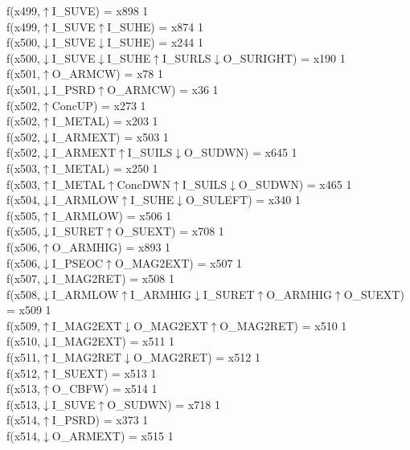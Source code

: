 f(x499,$\uparrow$I\_SUVE) = x898 {1} \\
f(x499,$\uparrow$I\_SUVE$\uparrow$I\_SUHE) = x874 {1} \\
f(x500,$\downarrow$I\_SUVE$\downarrow$I\_SUHE) = x244 {1} \\
f(x500,$\downarrow$I\_SUVE$\downarrow$I\_SUHE$\uparrow$I\_SURLS$\downarrow$O\_SURIGHT) = x190 {1} \\
f(x501,$\uparrow$O\_ARMCW) = x78 {1} \\
f(x501,$\downarrow$I\_PSRD$\uparrow$O\_ARMCW) = x36 {1} \\
f(x502,$\uparrow$ConcUP) = x273 {1} \\
f(x502,$\uparrow$I\_METAL) = x203 {1} \\
f(x502,$\downarrow$I\_ARMEXT) = x503 {1} \\
f(x502,$\downarrow$I\_ARMEXT$\uparrow$I\_SUILS$\downarrow$O\_SUDWN) = x645 {1} \\
f(x503,$\uparrow$I\_METAL) = x250 {1} \\
f(x503,$\uparrow$I\_METAL$\uparrow$ConcDWN$\uparrow$I\_SUILS$\downarrow$O\_SUDWN) = x465 {1} \\
f(x504,$\downarrow$I\_ARMLOW$\uparrow$I\_SUHE$\downarrow$O\_SULEFT) = x340 {1} \\
f(x505,$\uparrow$I\_ARMLOW) = x506 {1} \\
f(x505,$\downarrow$I\_SURET$\uparrow$O\_SUEXT) = x708 {1} \\
f(x506,$\uparrow$O\_ARMHIG) = x893 {1} \\
f(x506,$\downarrow$I\_PSEOC$\uparrow$O\_MAG2EXT) = x507 {1} \\
f(x507,$\downarrow$I\_MAG2RET) = x508 {1} \\
f(x508,$\downarrow$I\_ARMLOW$\uparrow$I\_ARMHIG$\downarrow$I\_SURET$\uparrow$O\_ARMHIG$\uparrow$O\_SUEXT) = x509 {1} \\
f(x509,$\uparrow$I\_MAG2EXT$\downarrow$O\_MAG2EXT$\uparrow$O\_MAG2RET) = x510 {1} \\
f(x510,$\downarrow$I\_MAG2EXT) = x511 {1} \\
f(x511,$\uparrow$I\_MAG2RET$\downarrow$O\_MAG2RET) = x512 {1} \\
f(x512,$\uparrow$I\_SUEXT) = x513 {1} \\
f(x513,$\uparrow$O\_CBFW) = x514 {1} \\
f(x513,$\downarrow$I\_SUVE$\uparrow$O\_SUDWN) = x718 {1} \\
f(x514,$\uparrow$I\_PSRD) = x373 {1} \\
f(x514,$\downarrow$O\_ARMEXT) = x515 {1} \\

